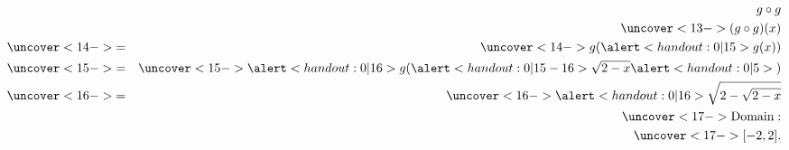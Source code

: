 \begin{frame}
\begin{example}
\begin{columns}[t]
\begin{eqnarray*}
& &  g\circ g \\
& & \uncover<13->{(g\circ g)(x)}\\
& \uncover<14->{ = } & \uncover<14->{g(\alert<handout:0| 15>{g(x)})}\\
& \uncover<15->{ = } & \uncover<15->{\alert<handout:0| 16>{g(}\alert<handout:0| 15-16>{\sqrt{2 - x}}\alert<handout:0| 5>{)}}\\
& \uncover<16->{ = } & \uncover<16->{\alert<handout:0| 16>{\sqrt{2 - \sqrt{2-x}}}}\\
&&\uncover<17->{
\textrm{Domain}:}\\
&&\uncover<17->{
[-2 , 2].
}
\end{eqnarray*}
\end{columns}
\end{example}
\end{frame}
